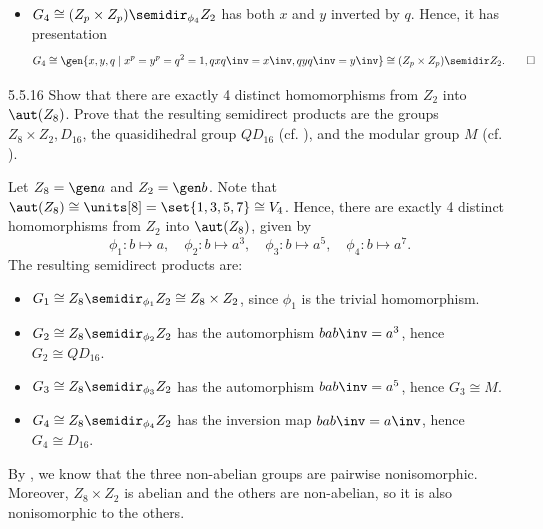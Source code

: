 \begin{sol}
\begin{itemize}
\begin{itemize}
	        We then have $\gen y \times \gen{q, x}$, where $\gen{q, x} \cong D_{2p}$.
	        Hence,
            \[
            	G_2 \cong Z_p \times D_{2p}.
            \]
            \item $G_4 \cong (Z_p \times Z_p) \semidir_{\phi_4} Z_2$ has both $x$ and $y$ inverted by $q$.
	        Hence, it has presentation
            \[
            	G_4 \cong \gen{x, y, q \mid x^p = y^p = q^2 = 1, qxq\inv = x\inv, qyq\inv = y\inv} \cong (Z_p \times Z_p) \semidir Z_2. \qedhere
            \]
        \end{itemize}
    \end{itemize}
\end{sol}

\begin{exercise}{5.5.16}
    Show that there are exactly 4 distinct homomorphisms from $Z_2$ into $\aut(Z_8)$.
	Prove that the resulting semidirect products are the groups $Z_8 \times Z_2, D_{16}$, the quasidihedral group $QD_{16}$ (cf. ), and the modular group $M$ (cf. ). 
\end{exercise}

\begin{sol}
    Let $Z_8 = \gen a$ and $Z_2 = \gen b$.
	Note that $\aut(Z_8) \cong \units[8] = \set{1, 3, 5, 7} \cong V_4$.
	Hence, there are exactly 4 distinct homomorphisms from $Z_2$ into $\aut(Z_8)$, given by
    \[
    	\phi_1 \colon b \mapsto a, \quad \phi_2 \colon b \mapsto a^3, \quad \phi_3 \colon b \mapsto a^5, \quad \phi_4 \colon b \mapsto a^7.
    \]
    The resulting semidirect products are:
    \begin{itemize}
        \item $G_1 \cong Z_8 \semidir_{\phi_1} Z_2 \cong Z_8 \times Z_2$, since $\phi_1$ is the trivial homomorphism.
        \item $G_2 \cong Z_8 \semidir_{\phi_2} Z_2$ has the automorphism $bab\inv = a^3$, hence $G_2 \cong QD_{16}$.
        \item $G_3 \cong Z_8 \semidir_{\phi_3} Z_2$ has the automorphism $bab\inv = a^5$, hence $G_3 \cong M$.
        \item $G_4 \cong Z_8 \semidir_{\phi_4} Z_2$ has the inversion map $bab\inv = a\inv$, hence $G_4 \cong D_{16}$.
    \end{itemize}
    By , we know that the three non-abelian groups are pairwise nonisomorphic.
	Moreover, $Z_8 \times Z_2$ is abelian and the others are non-abelian, so it is also nonisomorphic to the others.
\end{sol}

